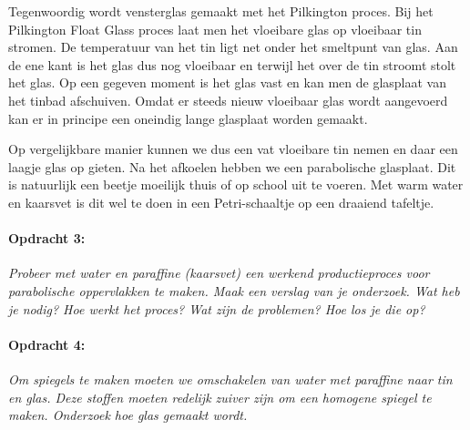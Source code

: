 Tegenwoordig wordt vensterglas gemaakt met het Pilkington proces.
Bij het Pilkington Float Glass proces laat men het vloeibare glas
op vloeibaar tin stromen. De temperatuur van het tin ligt net onder
het smeltpunt van glas. Aan de ene kant is het glas dus nog vloeibaar
en terwijl het over de tin stroomt stolt het glas. Op een gegeven
moment is het glas vast en kan men de glasplaat van het tinbad afschuiven.
Omdat er steeds nieuw vloeibaar glas wordt aangevoerd kan er in principe
een oneindig lange glasplaat worden gemaakt.

Op vergelijkbare manier kunnen we dus een vat vloeibare tin nemen
en daar een laagje glas op gieten. Na het afkoelen hebben we een parabolische
glasplaat. Dit is natuurlijk een beetje moeilijk thuis of op school
uit te voeren. Met warm water en kaarsvet is dit wel te doen in een
Petri-schaaltje op een draaiend tafeltje.


\paragraph*{Opdracht 3:}

\emph{Probeer met water en paraffine (kaarsvet) een werkend productieproces
voor parabolische oppervlakken te maken. Maak een verslag van je onderzoek.
Wat heb je nodig? Hoe werkt het proces? Wat zijn de problemen? Hoe
los je die op?}


\paragraph*{Opdracht 4:}

\emph{Om spiegels te maken moeten we omschakelen van water met paraffine
naar tin en glas. Deze stoffen moeten redelijk zuiver zijn om een
homogene spiegel te maken. Onderzoek hoe glas gemaakt wordt.}


